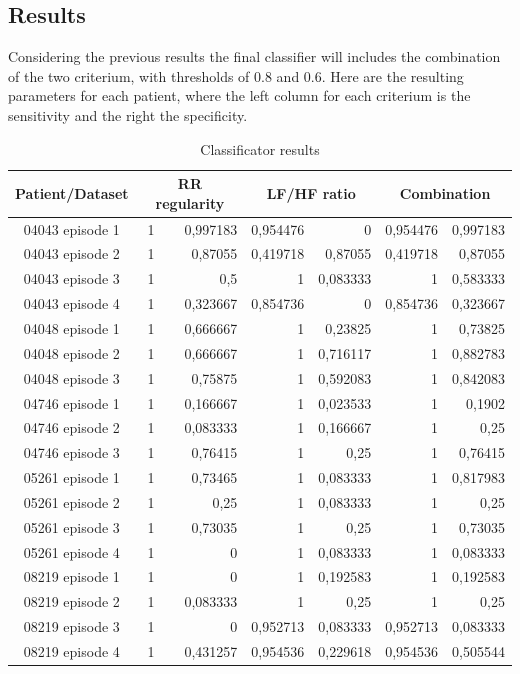 \documentclass[a4paper,titlepage]{article}
\begin{document}
\subsection{Results}
Considering the previous results the final classifier will includes the combination of the two criterium, with thresholds of 0.8 and 0.6.
Here are the resulting parameters for each patient, where the left column for each criterium is the sensitivity and the right the specificity.

\begin{table}[htbp]
  \centering
  \caption{Classificator results}
    \begin{tabular}{c |rr|rr|rr|}
    \multicolumn{1}{c|}{Patient/Dataset} & \multicolumn{2}{c|}{RR regularity} & \multicolumn{2}{c|}{LF/HF ratio} & \multicolumn{2}{c|}{Combination} & \\ \hline
    04043 episode 1 & 1     & 0,997183 & 0,954476 & 0     & 0,954476 & 0,997183 \\
    04043 episode 2 & 1     & 0,87055 & 0,419718 & 0,87055 & 0,419718 & 0,87055 \\
    04043 episode 3 & 1     & 0,5   & 1     & 0,083333 & 1     & 0,583333 \\
    04043 episode 4 & 1     & 0,323667 & 0,854736 & 0     & 0,854736 & 0,323667 \\
    04048 episode 1 & 1     & 0,666667 & 1     & 0,23825 & 1     & 0,73825 \\
    04048 episode 2 & 1     & 0,666667 & 1     & 0,716117 & 1     & 0,882783 \\
    04048 episode 3 & 1     & 0,75875 & 1     & 0,592083 & 1     & 0,842083 \\
    04746 episode 1 & 1     & 0,166667 & 1     & 0,023533 & 1     & 0,1902 \\
    04746 episode 2 & 1     & 0,083333 & 1     & 0,166667 & 1     & 0,25 \\
    04746 episode 3 & 1     & 0,76415 & 1     & 0,25  & 1     & 0,76415 \\
    05261 episode 1 & 1     & 0,73465 & 1     & 0,083333 & 1     & 0,817983 \\
    05261 episode 2 & 1     & 0,25  & 1     & 0,083333 & 1     & 0,25 \\
    05261 episode 3 & 1     & 0,73035 & 1     & 0,25  & 1     & 0,73035 \\
    05261 episode 4 & 1     & 0     & 1     & 0,083333 & 1     & 0,083333 \\
    08219 episode 1 & 1     & 0     & 1     & 0,192583 & 1     & 0,192583 \\
    08219 episode 2 & 1     & 0,083333 & 1     & 0,25  & 1     & 0,25 \\
    08219 episode 3 & 1     & 0     & 0,952713 & 0,083333 & 0,952713 & 0,083333 \\
    08219 episode 4 & 1     & 0,431257 & 0,954536 & 0,229618 & 0,954536 & 0,505544 \\

    \end{tabular}
  \label{tab:addlabel}
\end{table}

\clearpage
\end{document}
